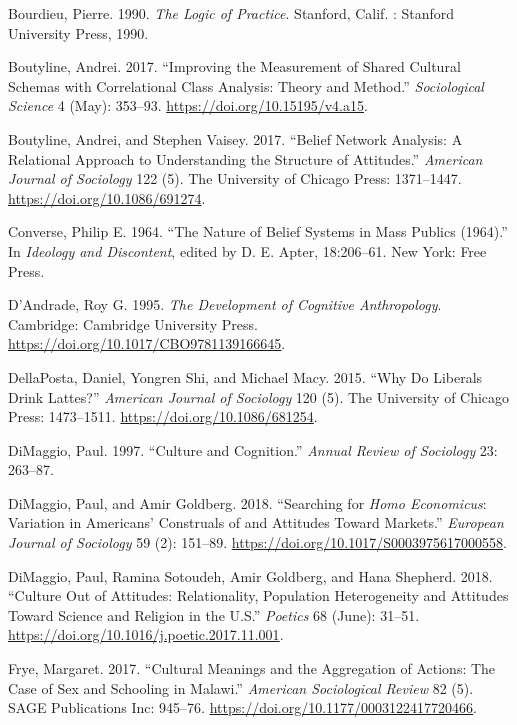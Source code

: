 \documentclass[12pt,]{article}
\begin{document}
\leavevmode\hypertarget{ref-bourdieu1990}{}%
Bourdieu, Pierre. 1990. \emph{The Logic of Practice}. Stanford, Calif. : Stanford University Press, 1990.

\leavevmode\hypertarget{ref-boutyline2017}{}%
Boutyline, Andrei. 2017. ``Improving the Measurement of Shared Cultural Schemas with Correlational Class Analysis: Theory and Method.'' \emph{Sociological Science} 4 (May): 353--93. \url{https://doi.org/10.15195/v4.a15}.

\leavevmode\hypertarget{ref-boutyline2017a}{}%
Boutyline, Andrei, and Stephen Vaisey. 2017. ``Belief Network Analysis: A Relational Approach to Understanding the Structure of Attitudes.'' \emph{American Journal of Sociology} 122 (5). The University of Chicago Press: 1371--1447. \url{https://doi.org/10.1086/691274}.

\leavevmode\hypertarget{ref-converse1964}{}%
Converse, Philip E. 1964. ``The Nature of Belief Systems in Mass Publics (1964).'' In \emph{Ideology and Discontent}, edited by D. E. Apter, 18:206--61. New York: Free Press.

\leavevmode\hypertarget{ref-dandrade1995}{}%
D'Andrade, Roy G. 1995. \emph{The Development of Cognitive Anthropology}. Cambridge: Cambridge University Press. \url{https://doi.org/10.1017/CBO9781139166645}.

\leavevmode\hypertarget{ref-dellaposta2015}{}%
DellaPosta, Daniel, Yongren Shi, and Michael Macy. 2015. ``Why Do Liberals Drink Lattes?'' \emph{American Journal of Sociology} 120 (5). The University of Chicago Press: 1473--1511. \url{https://doi.org/10.1086/681254}.

\leavevmode\hypertarget{ref-dimaggio1997}{}%
DiMaggio, Paul. 1997. ``Culture and Cognition.'' \emph{Annual Review of Sociology} 23: 263--87.

\leavevmode\hypertarget{ref-dimaggio2018}{}%
DiMaggio, Paul, and Amir Goldberg. 2018. ``Searching for \emph{Homo Economicus}: Variation in Americans' Construals of and Attitudes Toward Markets.'' \emph{European Journal of Sociology} 59 (2): 151--89. \url{https://doi.org/10.1017/S0003975617000558}.

\leavevmode\hypertarget{ref-dimaggio2018a}{}%
DiMaggio, Paul, Ramina Sotoudeh, Amir Goldberg, and Hana Shepherd. 2018. ``Culture Out of Attitudes: Relationality, Population Heterogeneity and Attitudes Toward Science and Religion in the U.S.'' \emph{Poetics} 68 (June): 31--51. \url{https://doi.org/10.1016/j.poetic.2017.11.001}.

\leavevmode\hypertarget{ref-frye2017}{}%
Frye, Margaret. 2017. ``Cultural Meanings and the Aggregation of Actions: The Case of Sex and Schooling in Malawi.'' \emph{American Sociological Review} 82 (5). SAGE Publications Inc: 945--76. \url{https://doi.org/10.1177/0003122417720466}.
\end{document}
